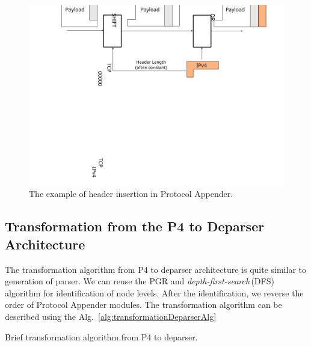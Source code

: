 \begin{figure}[ht]
    \centering
    \includegraphics[scale=0.45]{chapters/pic/ProtocolAppenderPrincip}
    \caption{The example of header insertion in Protocol Appender.}
    \label{fig:protocol-appender-princip}
\end{figure}

\subsection{Transformation from the P4 to Deparser Architecture}
\label{sec:deparserTransfAlg}

The transformation algorithm from P4 to deparser architecture is quite similar to generation of parser. We can reuse
the PGR and \textit{depth-first-search}\,(DFS) algorithm for identification of node levels. 
After the identification, we reverse the order of Protocol Appender modules.
The transformation algorithm can be described using the Alg.~\ref{alg:transformationDeparserAlg}

\begin{algorithm}[ht]
    \caption{Brief transformation algorithm from P4 to deparser.}
    \SetAlgoLined
    \label{alg:transformationDeparserAlg}
\end{algorithm}

